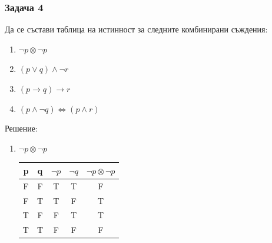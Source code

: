 \documentclass[fleqn, 12pt]{article}
\theoremstyle{definition}
\begin{document}
\subsubsection*{Задача 4}
Да се състави таблица на истинност за следните комбинирани съждения:
\begin{enumerate}
\item $\neg p \otimes \neg p$
\item $(p \lor q) \land \neg r$
\item $(p \to q) \to r$
\item $(p \land \neg q) \Leftrightarrow (p \land r)$
\end{enumerate}
Решение: 
\begin{enumerate}
\item $\neg p \otimes \neg p$
\begin{table}[htp]
  \begin{center}
    \begin{tabular}{|c|c|c|c|c|} 
\hline
      \textbf{p} & \textbf{q}  & \textbf{ $\neg p$ } & \textbf{$\neg q$} & \textbf{ $\neg p \otimes \neg p$}\\
      \hline
	F & F & T & T & F\\
\hline
	F & T & T & F & T\\
\hline
	T & F & F  & T & T\\
\hline
 	T & T & F  & F & F\\
\hline
    \end{tabular}
  \end{center}
\end{table}


\end{enumerate}
\end{document}
